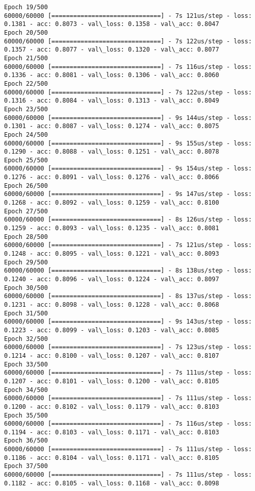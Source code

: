 \documentclass[11pt]{article}
\begin{document}
\begin{Verbatim}[commandchars=\\\{\}]
Epoch 19/500
60000/60000 [==============================] - 7s 121us/step - loss: 0.1381 - acc: 0.8073 - val\_loss: 0.1358 - val\_acc: 0.8047
Epoch 20/500
60000/60000 [==============================] - 7s 122us/step - loss: 0.1357 - acc: 0.8077 - val\_loss: 0.1320 - val\_acc: 0.8077
Epoch 21/500
60000/60000 [==============================] - 7s 116us/step - loss: 0.1336 - acc: 0.8081 - val\_loss: 0.1306 - val\_acc: 0.8060
Epoch 22/500
60000/60000 [==============================] - 7s 122us/step - loss: 0.1316 - acc: 0.8084 - val\_loss: 0.1313 - val\_acc: 0.8049
Epoch 23/500
60000/60000 [==============================] - 9s 144us/step - loss: 0.1301 - acc: 0.8087 - val\_loss: 0.1274 - val\_acc: 0.8075
Epoch 24/500
60000/60000 [==============================] - 9s 155us/step - loss: 0.1290 - acc: 0.8088 - val\_loss: 0.1251 - val\_acc: 0.8078
Epoch 25/500
60000/60000 [==============================] - 9s 154us/step - loss: 0.1276 - acc: 0.8091 - val\_loss: 0.1276 - val\_acc: 0.8066
Epoch 26/500
60000/60000 [==============================] - 9s 147us/step - loss: 0.1268 - acc: 0.8092 - val\_loss: 0.1259 - val\_acc: 0.8100
Epoch 27/500
60000/60000 [==============================] - 8s 126us/step - loss: 0.1259 - acc: 0.8093 - val\_loss: 0.1235 - val\_acc: 0.8081
Epoch 28/500
60000/60000 [==============================] - 7s 121us/step - loss: 0.1248 - acc: 0.8095 - val\_loss: 0.1221 - val\_acc: 0.8093
Epoch 29/500
60000/60000 [==============================] - 8s 138us/step - loss: 0.1240 - acc: 0.8096 - val\_loss: 0.1224 - val\_acc: 0.8097
Epoch 30/500
60000/60000 [==============================] - 8s 137us/step - loss: 0.1231 - acc: 0.8098 - val\_loss: 0.1228 - val\_acc: 0.8068
Epoch 31/500
60000/60000 [==============================] - 9s 143us/step - loss: 0.1223 - acc: 0.8099 - val\_loss: 0.1203 - val\_acc: 0.8085
Epoch 32/500
60000/60000 [==============================] - 7s 123us/step - loss: 0.1214 - acc: 0.8100 - val\_loss: 0.1207 - val\_acc: 0.8107
Epoch 33/500
60000/60000 [==============================] - 7s 111us/step - loss: 0.1207 - acc: 0.8101 - val\_loss: 0.1200 - val\_acc: 0.8105
Epoch 34/500
60000/60000 [==============================] - 7s 111us/step - loss: 0.1200 - acc: 0.8102 - val\_loss: 0.1179 - val\_acc: 0.8103
Epoch 35/500
60000/60000 [==============================] - 7s 116us/step - loss: 0.1194 - acc: 0.8103 - val\_loss: 0.1171 - val\_acc: 0.8103
Epoch 36/500
60000/60000 [==============================] - 7s 111us/step - loss: 0.1186 - acc: 0.8104 - val\_loss: 0.1171 - val\_acc: 0.8105
Epoch 37/500
60000/60000 [==============================] - 7s 111us/step - loss: 0.1182 - acc: 0.8105 - val\_loss: 0.1168 - val\_acc: 0.8098

\end{Verbatim}
\end{document}
